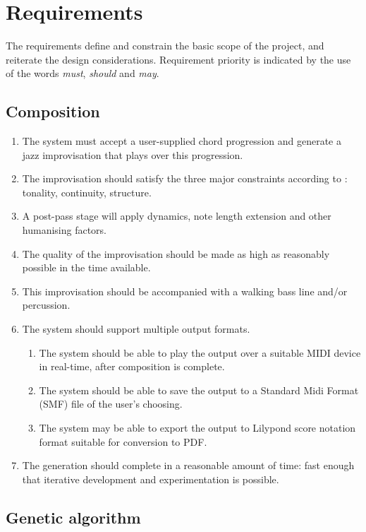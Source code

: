 \newpage
\section{Requirements}
\label{reqs}

The requirements define and constrain the basic scope of the project, and reiterate the design considerations. Requirement priority is indicated by the use of the words \emph{must}, \emph{should} and \emph{may}.

\subsection{Composition}

\begin{enumerate}
	\item The system must accept a user-supplied chord progression and generate a jazz improvisation that plays over this progression.
	\item The improvisation should satisfy the three major constraints according to \cite{grachten01}: tonality, continuity, structure.
	\item A post-pass stage will apply dynamics, note length extension and other humanising factors.
	\item The quality of the improvisation should be made as high as reasonably possible in the time available.
	\item This improvisation should be accompanied with a walking bass line and/or percussion.
    \item The system should support multiple output formats.
    \begin{enumerate}
    	\item The system should be able to play the output over a suitable MIDI device in real-time, after composition is complete.
    	\item The system should be able to save the output to a Standard Midi Format (SMF) file of the user's choosing.
    	\item The system may be able to export the output to Lilypond score notation format suitable for conversion to PDF.
    \end{enumerate}
    \item The generation should complete in a reasonable amount of time: fast enough that iterative development and experimentation is possible.
\end{enumerate}

\subsection{Genetic algorithm}

